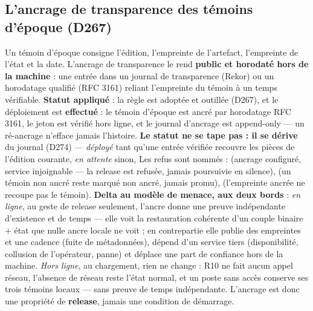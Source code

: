 \subsection{L'ancrage de transparence des témoins d'époque (D267)}\label{sec:transparence}

Un témoin d'époque consigne l'édition, l'empreinte de l'artefact, l'empreinte de l'état et
la date. L'ancrage de transparence le rend \textbf{public et horodaté hors de la machine} :
une entrée dans un journal de transparence (Rekor) ou un horodatage qualifié (RFC 3161)
reliant l'empreinte du témoin à un temps vérifiable. \textbf{Statut appliqué} : la règle est
adoptée et outillée (D267), et le déploiement est \textbf{effectué} : le témoin d'époque est
ancré par horodatage RFC 3161, le jeton est vérifié hors ligne, et le journal d'ancrage est
append-only — un ré-ancrage n'efface jamais l'histoire. \textbf{Le statut ne se tape pas : il
se dérive} du journal (D274) — \emph{déployé} tant qu'une entrée vérifiée recouvre les pièces de
l'édition courante, \emph{en attente} sinon,
 Les refus sont nommés :  (ancrage configuré, service
injoignable — la release est refusée, jamais poursuivie en silence), 
(un témoin non ancré reste marqué non ancré, jamais promu), 
(l'empreinte ancrée ne recoupe pas le témoin). \textbf{Delta au modèle de menace, aux deux
bords} : \emph{en ligne}, au geste de release seulement, l'ancre donne une preuve
indépendante d'existence et de temps — elle voit la restauration cohérente d'un couple
binaire + état que nulle ancre locale ne voit ; en contrepartie elle publie des empreintes
et une cadence (fuite de métadonnées), dépend d'un service tiers (disponibilité, collusion
de l'opérateur, panne) et déplace une part de confiance hors de la machine. \emph{Hors
ligne}, au chargement, rien ne change : R10 ne fait aucun appel réseau, l'absence de réseau
reste l'état normal, et un poste sans accès conserve ses trois témoins locaux — sans preuve
de temps indépendante. L'ancrage est donc une propriété de \textbf{release}, jamais une
condition de démarrage.
